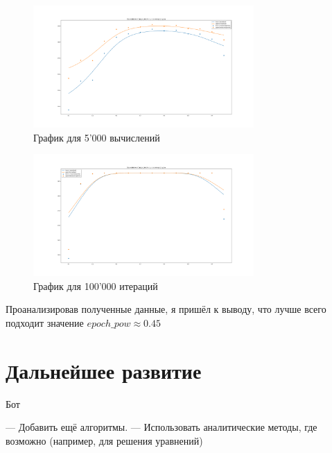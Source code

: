 \documentclass[11pt]{article}
\begin{document}
    \begin{figure}[h]
        \centering
        \includegraphics[width=0.75\textwidth]{exploring_optimal_epoch_pow_5000_iterations.png}
        \caption{График для 5'000 вычислений}
        \label{fig:epoch-pow-5000}
    \end{figure}
    \FloatBarrier

    \begin{figure}[h]
        \centering
        \includegraphics[width=0.75\textwidth]{exploring_optimal_epoch_pow_100000_iterations.png}
        \caption{График для 100'000 итераций}
        \label{fig:epoch-pow-100000}
    \end{figure}
    \FloatBarrier

    Проанализировав полученные данные, я пришёл к выводу, что лучше всего подходит значение $epoch\_pow \approx 0.45$

    \section{Дальнейшее развитие}\label{sec:subsequent-development}

    Бот

    — Добавить ещё алгоритмы.
    — Использовать аналитические методы, где возможно (например, для решения уравнений)
\end{document}
